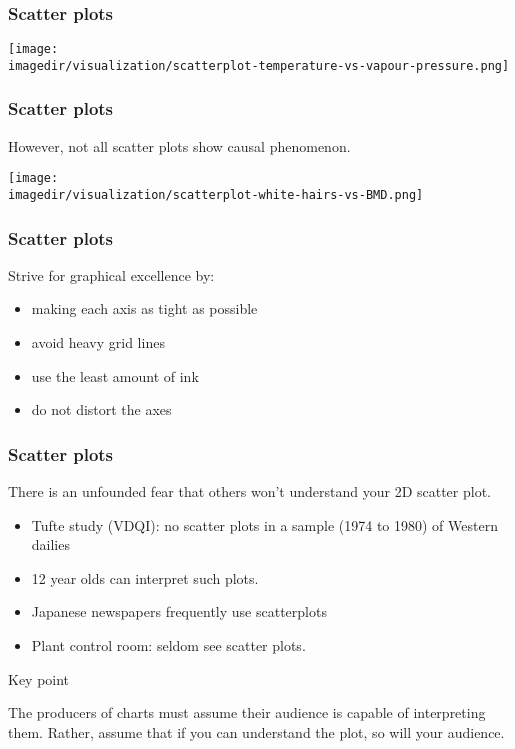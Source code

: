 \begin{frame}\frametitle{Scatter plots}
	\begin{center}
		\texttt{[image: \\imagedir/visualization/scatterplot-temperature-vs-vapour-pressure.png]}
	\end{center}
\end{frame}

\begin{frame}\frametitle{Scatter plots}
	However, not all scatter plots show causal phenomenon. 
	\begin{center}
		\texttt{[image: \\imagedir/visualization/scatterplot-white-hairs-vs-BMD.png]}
	\end{center}
\end{frame}


\begin{frame}\frametitle{Scatter plots}
	Strive for graphical excellence by:
	\begin{itemize}
		\item	making each axis as tight as possible 
		\item	avoid heavy grid lines 
		\item	use the least amount of ink 
		\item	do not distort the axes 
	\end{itemize}
\end{frame}

\begin{frame}\frametitle{Scatter plots}
	There is an unfounded fear that others won't understand your 2D scatter plot. 
	\begin{itemize}
		\item	Tufte study (VDQI): no scatter plots in a sample (1974 to 1980) of Western dailies 
		\item	12 year olds can interpret such plots. 
		\item	Japanese newspapers frequently use scatterplots 
		\item	Plant control room: seldom see scatter plots. 
	\end{itemize}
	\begin{block}
		{Key point} 
		\begin{center}
			The producers of charts must assume their audience is capable of interpreting them. Rather, assume that if you can understand the plot, so will your audience. 
		\end{center}
	\end{block}
\end{frame}

